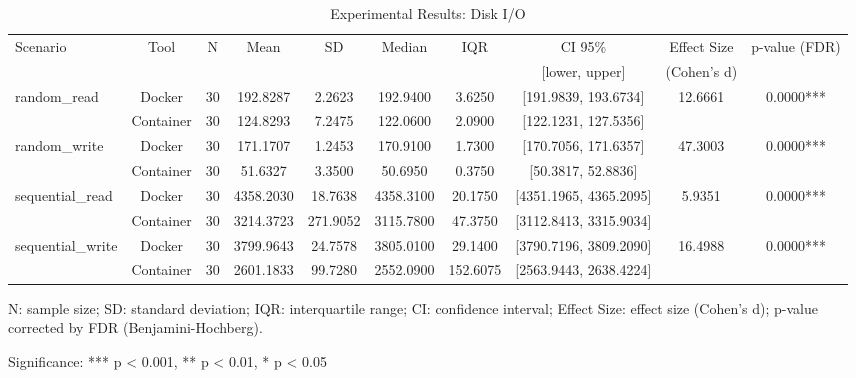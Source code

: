 \documentclass{article}
\begin{document}
\begin{table}[h]
\centering
\small
\caption{Experimental Results: Disk I/O}
\label{tab:disk_i_o}
\begin{tabular}{lccccccccc}
\toprule
Scenario & Tool & N & Mean & SD & Median & IQR & CI 95\% & Effect Size & p-value (FDR) \\
 & & & & & & & [lower, upper] & (Cohen's d) & \\
\midrule
\multirow{2}{*}{random\_read} & Docker & 30 & 192.8287 & 2.2623 & 192.9400 & 3.6250 & [191.9839, 193.6734] & 12.6661 & 0.0000*** \\
 & Container & 30 & 124.8293 & 7.2475 & 122.0600 & 2.0900 & [122.1231, 127.5356] &  &  \\
\midrule
\multirow{2}{*}{random\_write} & Docker & 30 & 171.1707 & 1.2453 & 170.9100 & 1.7300 & [170.7056, 171.6357] & 47.3003 & 0.0000*** \\
 & Container & 30 & 51.6327 & 3.3500 & 50.6950 & 0.3750 & [50.3817, 52.8836] &  &  \\
\midrule
\multirow{2}{*}{sequential\_read} & Docker & 30 & 4358.2030 & 18.7638 & 4358.3100 & 20.1750 & [4351.1965, 4365.2095] & 5.9351 & 0.0000*** \\
 & Container & 30 & 3214.3723 & 271.9052 & 3115.7800 & 47.3750 & [3112.8413, 3315.9034] &  &  \\
\midrule
\multirow{2}{*}{sequential\_write} & Docker & 30 & 3799.9643 & 24.7578 & 3805.0100 & 29.1400 & [3790.7196, 3809.2090] & 16.4988 & 0.0000*** \\
 & Container & 30 & 2601.1833 & 99.7280 & 2552.0900 & 152.6075 & [2563.9443, 2638.4224] &  &  \\
\midrule
\bottomrule
\end{tabular}
\begin{tablenotes}
\small
\item N: sample size; SD: standard deviation; IQR: interquartile range; CI: confidence interval; Effect Size: effect size (Cohen's d); p-value corrected by FDR (Benjamini-Hochberg).
\item Significance: *** p < 0.001, ** p < 0.01, * p < 0.05
\end{tablenotes}
\end{table}

\end{document}
